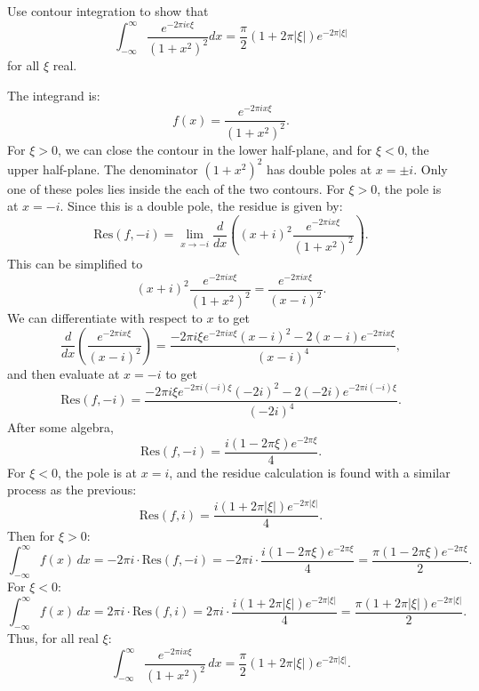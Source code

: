 \documentclass[12pt]{article}
\begin{document}
\begin{statement}[5]
  Use contour integration to show that 
  $$ \int^{\infty}_{-\infty} \frac{e^{-2 \pi i e \xi}}{(1+x^2)^2}dx = \frac{\pi}{2}(1+2\pi \vert \xi \vert )e^{-2\pi \vert \xi \vert} $$
  for all $\xi$ real. 
\end{statement}
\begin{newproof}
    The integrand is:
    $$ f(x) = \frac{e^{-2 \pi i x \xi}}{(1+x^2)^2}. $$
    For $ \xi > 0 $, we can close the contour in the lower half-plane, and for $ \xi < 0 $, the upper half-plane. The denominator $ (1+x^2)^2 $ has double poles at $ x = \pm i $. Only one of these poles lies inside the each of the two contours. For $ \xi > 0 $, the pole is at $ x = -i $. Since this is a double pole, the residue is given by:
    $$ \text{Res}(f, -i) = \lim_{x \to -i} \frac{d}{dx} \left( (x+i)^2 \frac{e^{-2 \pi i x \xi}}{(1+x^2)^2} \right). $$
    This can be simplified to
    $$ (x+i)^2 \frac{e^{-2 \pi i x \xi}}{(1+x^2)^2} = \frac{e^{-2 \pi i x \xi}}{(x-i)^2}. $$
    We can differentiate with respect to $ x $ to get
    $$ \frac{d}{dx} \left( \frac{e^{-2 \pi i x \xi}}{(x-i)^2} \right) = \frac{-2 \pi i \xi e^{-2 \pi i x \xi} (x-i)^2 - 2(x-i) e^{-2 \pi i x \xi}}{(x-i)^4}, $$
    and then evaluate at $ x = -i $ to get
    $$ \text{Res}(f, -i) = \frac{-2 \pi i \xi e^{-2 \pi i (-i) \xi} (-2i)^2 - 2(-2i) e^{-2 \pi i (-i) \xi}}{(-2i)^4}. $$
    After some algebra, 
    $$ \text{Res}(f, -i) = \frac{i(1 - 2 \pi \xi) e^{-2 \pi \xi}}{4}. $$
    For $ \xi < 0 $, the pole is at $ x = i $, and the residue calculation is found with a similar process as the previous:
    $$ \text{Res}(f, i) = \frac{i(1 + 2 \pi |\xi|) e^{-2 \pi |\xi|}}{4}. $$
    Then for $ \xi > 0 $:
    $$ \int^{\infty}_{-\infty} f(x) \, dx = -2 \pi i \cdot \text{Res}(f, -i) = -2 \pi i \cdot \frac{i(1 - 2 \pi \xi) e^{-2 \pi \xi}}{4} = \frac{\pi (1 - 2 \pi \xi) e^{-2 \pi \xi}}{2}. $$
    For $ \xi < 0 $: 
    $$ \int^{\infty}_{-\infty} f(x) \, dx = 2 \pi i \cdot \text{Res}(f, i) = 2 \pi i \cdot \frac{i(1 + 2 \pi |\xi|) e^{-2 \pi |\xi|}}{4} = \frac{\pi (1 + 2 \pi |\xi|) e^{-2 \pi |\xi|}}{2}. $$
    Thus, for all real $ \xi $:
    $$ \int^{\infty}_{-\infty} \frac{e^{-2 \pi i x \xi}}{(1+x^2)^2} \, dx = \frac{\pi}{2}(1 + 2 \pi |\xi|) e^{-2 \pi |\xi|}. $$
\end{newproof}

\end{document}
